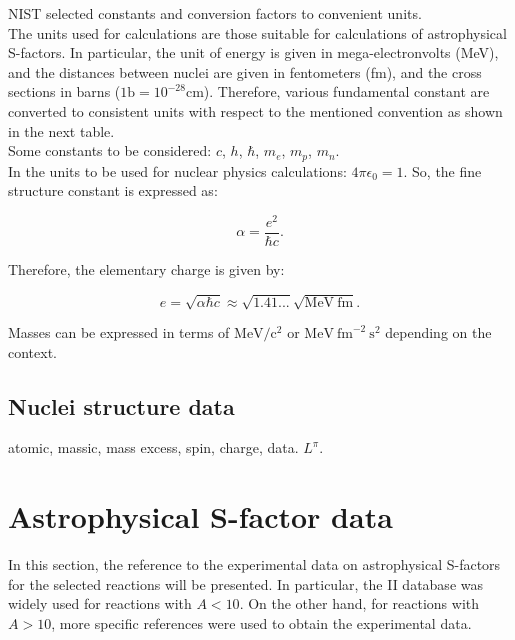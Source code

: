 \documentclass[openany]{book}
\begin{document}
NIST selected constants and conversion factors to convenient units. \\

The units used for calculations are those suitable for calculations of astrophysical S-factors. In particular, the unit of energy is given in mega-electronvolts (MeV), and the distances between nuclei are given in fentometers (fm), and the cross sections in barns ($\mathrm{1b = 10^{-28}cm}$). Therefore, various fundamental constant are converted to consistent units with respect to the mentioned convention as shown in the next table. \\

Some constants to be considered: $c$, $h$, $\hbar$, $m_e$, $m_p$, $m_n$. \\

In the units to be used for nuclear physics calculations: $4\pi\epsilon_0 = 1$. So, the fine structure constant is expressed as:

\begin{equation} \label{eq:constants_alpha}
	\alpha = \frac{e^2}{\hbar c}.
\end{equation}

Therefore, the elementary charge is given by: 

\begin{equation} \label{eq:constants_e}
	e = \sqrt{\alpha\hbar c} \approx \sqrt{1.41...} \sqrt{\mathrm{MeV \ fm}}.
\end{equation}

Masses can be expressed in terms of $\mathrm{MeV/c^2}$ or $\mathrm{MeV \ {fm}^{-2} \ s^{2}}$ depending on the context.  

\subsection{Nuclei structure data} \label{sub:nucleiStructureData}

atomic, massic, mass excess, spin, charge, data. $L^{\pi}$.

\section{Astrophysical S-factor data} \label{sec:sfactorData}

In this section, the reference to the experimental data on astrophysical S-factors for the selected reactions will be presented. In particular, the  II database was widely used for reactions with $A < 10$. On the other hand, for reactions with $A > 10$, more specific references were used to obtain the experimental data.
\end{document}
